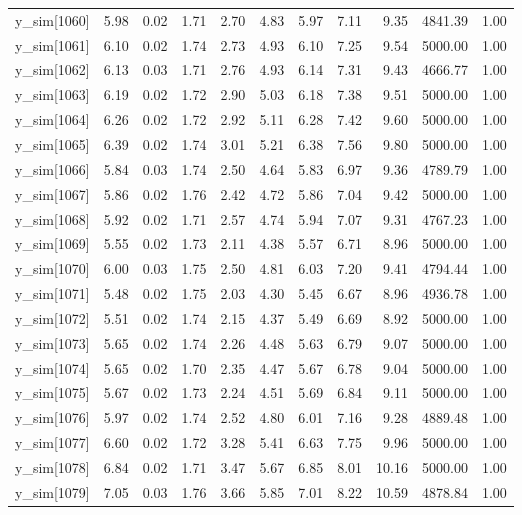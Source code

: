 \begin{table}[ht]
\begin{tabular}{rrrrrrrrrrr}
  y\_sim[1060] & 5.98 & 0.02 & 1.71 & 2.70 & 4.83 & 5.97 & 7.11 & 9.35 & 4841.39 & 1.00 \\ 
  y\_sim[1061] & 6.10 & 0.02 & 1.74 & 2.73 & 4.93 & 6.10 & 7.25 & 9.54 & 5000.00 & 1.00 \\ 
  y\_sim[1062] & 6.13 & 0.03 & 1.71 & 2.76 & 4.93 & 6.14 & 7.31 & 9.43 & 4666.77 & 1.00 \\ 
  y\_sim[1063] & 6.19 & 0.02 & 1.72 & 2.90 & 5.03 & 6.18 & 7.38 & 9.51 & 5000.00 & 1.00 \\ 
  y\_sim[1064] & 6.26 & 0.02 & 1.72 & 2.92 & 5.11 & 6.28 & 7.42 & 9.60 & 5000.00 & 1.00 \\ 
  y\_sim[1065] & 6.39 & 0.02 & 1.74 & 3.01 & 5.21 & 6.38 & 7.56 & 9.80 & 5000.00 & 1.00 \\ 
  y\_sim[1066] & 5.84 & 0.03 & 1.74 & 2.50 & 4.64 & 5.83 & 6.97 & 9.36 & 4789.79 & 1.00 \\ 
  y\_sim[1067] & 5.86 & 0.02 & 1.76 & 2.42 & 4.72 & 5.86 & 7.04 & 9.42 & 5000.00 & 1.00 \\ 
  y\_sim[1068] & 5.92 & 0.02 & 1.71 & 2.57 & 4.74 & 5.94 & 7.07 & 9.31 & 4767.23 & 1.00 \\ 
  y\_sim[1069] & 5.55 & 0.02 & 1.73 & 2.11 & 4.38 & 5.57 & 6.71 & 8.96 & 5000.00 & 1.00 \\ 
  y\_sim[1070] & 6.00 & 0.03 & 1.75 & 2.50 & 4.81 & 6.03 & 7.20 & 9.41 & 4794.44 & 1.00 \\ 
  y\_sim[1071] & 5.48 & 0.02 & 1.75 & 2.03 & 4.30 & 5.45 & 6.67 & 8.96 & 4936.78 & 1.00 \\ 
  y\_sim[1072] & 5.51 & 0.02 & 1.74 & 2.15 & 4.37 & 5.49 & 6.69 & 8.92 & 5000.00 & 1.00 \\ 
  y\_sim[1073] & 5.65 & 0.02 & 1.74 & 2.26 & 4.48 & 5.63 & 6.79 & 9.07 & 5000.00 & 1.00 \\ 
  y\_sim[1074] & 5.65 & 0.02 & 1.70 & 2.35 & 4.47 & 5.67 & 6.78 & 9.04 & 5000.00 & 1.00 \\ 
  y\_sim[1075] & 5.67 & 0.02 & 1.73 & 2.24 & 4.51 & 5.69 & 6.84 & 9.11 & 5000.00 & 1.00 \\ 
  y\_sim[1076] & 5.97 & 0.02 & 1.74 & 2.52 & 4.80 & 6.01 & 7.16 & 9.28 & 4889.48 & 1.00 \\ 
  y\_sim[1077] & 6.60 & 0.02 & 1.72 & 3.28 & 5.41 & 6.63 & 7.75 & 9.96 & 5000.00 & 1.00 \\ 
  y\_sim[1078] & 6.84 & 0.02 & 1.71 & 3.47 & 5.67 & 6.85 & 8.01 & 10.16 & 5000.00 & 1.00 \\ 
  y\_sim[1079] & 7.05 & 0.03 & 1.76 & 3.66 & 5.85 & 7.01 & 8.22 & 10.59 & 4878.84 & 1.00 \\ 

\end{tabular}
\end{table}
